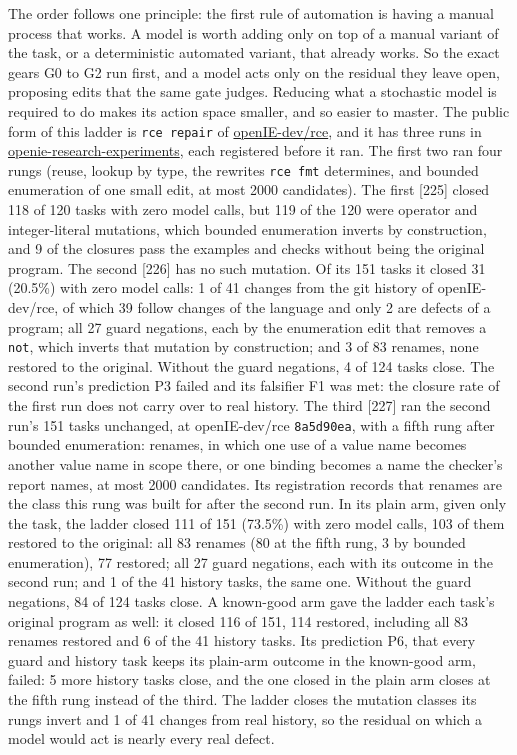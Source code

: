 \documentclass[10pt,letterpaper]{article}
\newcounter{none}
\begin{document}
The order follows one principle: the first rule of automation is having
a manual process that works. A model is worth adding only on top of a
manual variant of the task, or a deterministic automated variant, that
already works. So the exact gears G0 to G2 run first, and a model acts
only on the residual they leave open, proposing edits that the same gate
judges. Reducing what a stochastic model is required to do makes its
action space smaller, and so easier to master. The public form of this
ladder is \texttt{rce\ repair} of
\href{https://github.com/openIE-dev/rce}{openIE-dev/rce}, and it has
three runs in
\href{https://github.com/openIE-dev/openie-research-experiments}{openie-research-experiments},
each registered before it ran. The first two ran four rungs (reuse,
lookup by type, the rewrites \texttt{rce\ fmt} determines, and bounded
enumeration of one small edit, at most 2000 candidates). The first
{[}225{]} closed 118 of 120 tasks with zero model calls, but 119 of the
120 were operator and integer-literal mutations, which bounded
enumeration inverts by construction, and 9 of the closures pass the
examples and checks without being the original program. The second
{[}226{]} has no such mutation. Of its 151 tasks it closed 31 (20.5\%)
with zero model calls: 1 of 41 changes from the git history of
openIE-dev/rce, of which 39 follow changes of the language and only 2
are defects of a program; all 27 guard negations, each by the
enumeration edit that removes a \texttt{not}, which inverts that
mutation by construction; and 3 of 83 renames, none restored to the
original. Without the guard negations, 4 of 124 tasks close. The second
run's prediction P3 failed and its falsifier F1 was met: the closure
rate of the first run does not carry over to real history. The third
{[}227{]} ran the second run's 151 tasks unchanged, at openIE-dev/rce
\texttt{8a5d90ea}, with a fifth rung after bounded enumeration: renames,
in which one use of a value name becomes another value name in scope
there, or one binding becomes a name the checker's report names, at most
2000 candidates. Its registration records that renames are the class
this rung was built for after the second run. In its plain arm, given
only the task, the ladder closed 111 of 151 (73.5\%) with zero model
calls, 103 of them restored to the original: all 83 renames (80 at the
fifth rung, 3 by bounded enumeration), 77 restored; all 27 guard
negations, each with its outcome in the second run; and 1 of the 41
history tasks, the same one. Without the guard negations, 84 of 124
tasks close. A known-good arm gave the ladder each task's original
program as well: it closed 116 of 151, 114 restored, including all 83
renames restored and 6 of the 41 history tasks. Its prediction P6, that
every guard and history task keeps its plain-arm outcome in the
known-good arm, failed: 5 more history tasks close, and the one closed
in the plain arm closes at the fifth rung instead of the third. The
ladder closes the mutation classes its rungs invert and 1 of 41 changes
from real history, so the residual on which a model would act is nearly
every real defect.
\end{document}
